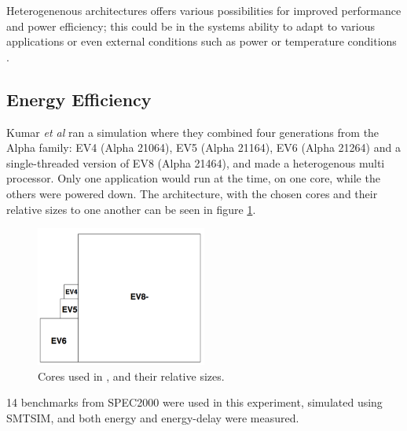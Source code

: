 Heterogenenous architectures offers various possibilities for improved performance and power efficiency;
this could be in the systems ability to adapt to various applications or even external conditions such as
power or temperature conditions \cite{heterogeneous-ee, heterogeneous-perf, heterogeneous-arch}.


\subsection{Energy Efficiency}
\label{subsec:rw_ee} 
Kumar \textit{et al}\cite{heterogeneous-ee} ran a simulation where they combined four generations from the Alpha family: EV4 (Alpha 21064), EV5 (Alpha 21164), EV6 (Alpha 21264) and a single-threaded version of EV8 (Alpha 21464), and made a heterogenous multi processor.
Only one application would run at the time, on one core, while the others were powered down.
The architecture, with the chosen cores and their relative sizes to one another can be seen in figure
\ref{fig:Kumar1}.

\begin{figure}[htb]
    \centering
    \includegraphics[width=0.5\textwidth]{Figures/Heterogeneous/Kumar1}
    \caption{Cores used in \cite{heterogeneous-ee}, and their relative sizes.}
    \label{fig:Kumar1}
\end{figure}


14 benchmarks from SPEC2000 were used in this experiment, simulated using SMTSIM, and both energy and energy-delay were measured.

